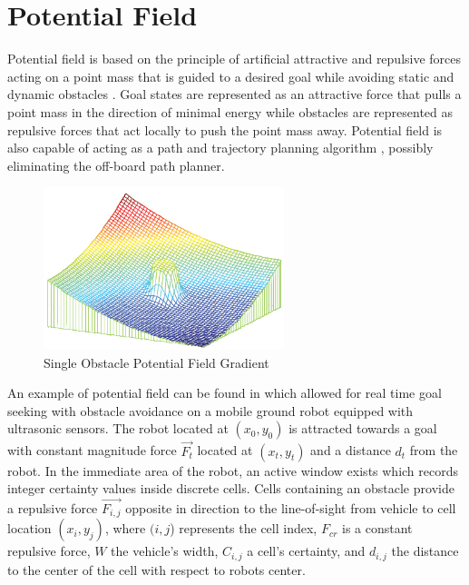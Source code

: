 \documentclass[numbered,pdftex]{ohio-etd}
\begin{document}
\section{Potential Field}


Potential field is based on the principle of artificial attractive and repulsive forces acting on a point mass that is guided to a desired goal while avoiding static and dynamic obstacles \cite{khatib_real-time_1986}. Goal states are represented as an attractive force that pulls a point mass in the direction of minimal energy while obstacles are represented as repulsive forces that act locally to push the point mass away. Potential field is also capable of acting as a path and trajectory planning algorithm \cite{rimon_exact_1992}, possibly eliminating the off-board path planner. 

\begin{figure}[H]
	\centering
	\includegraphics[width=7cm]{PaperFigures/pfObstacle}
	\caption{Single Obstacle Potential Field Gradient \cite{liu_virtual-waypoint_2016}}
	\label{fig:pfobstacle}
\end{figure}


An example of potential field can be found in \cite{borenstein_real-time_1990,borenstein_vector_1991,koren_potential_1991} which allowed for real time goal seeking with obstacle avoidance on a mobile ground robot equipped with ultrasonic sensors. The robot located at $(x_0,y_0)$ is attracted towards a goal with constant magnitude force $\overrightarrow{F_t}$ located at $(x_t,y_t)$ and a distance $d_t$ from the robot. In the immediate area of the robot, an active window exists which records integer certainty values inside discrete cells. Cells containing an obstacle provide a repulsive force $\overrightarrow{F_{i,j}}$ opposite in direction to the line-of-sight from vehicle to cell location $(x_i,y_j)$, where $(i,j$) represents the cell index, $F_{cr}$ is a constant repulsive force, $W$ the vehicle's width, $C_{i,j}$ a cell's certainty, and $d_{i,j}$ the distance to the center of the cell with respect to robots center.
\end{document}
